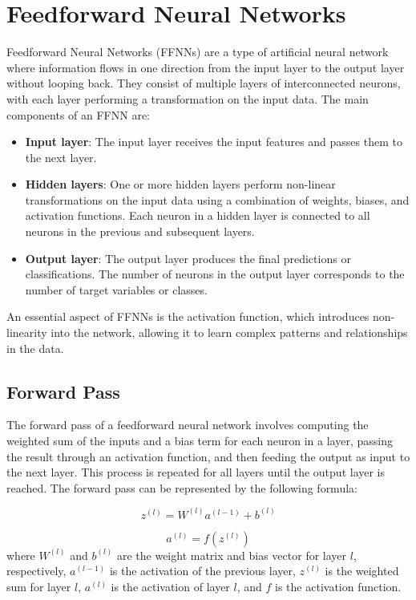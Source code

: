 \documentclass[12pt]{article}
\begin{document}
\section{Feedforward Neural Networks}

Feedforward Neural Networks (FFNNs) are a type of artificial neural network where information flows in one direction from the input layer to the output layer without looping back. They consist of multiple layers of interconnected neurons, with each layer performing a transformation on the input data. The main components of an FFNN are:

\begin{itemize}
\item \textbf{Input layer}: The input layer receives the input features and passes them to the next layer.
\item \textbf{Hidden layers}: One or more hidden layers perform non-linear transformations on the input data using a combination of weights, biases, and activation functions. Each neuron in a hidden layer is connected to all neurons in the previous and subsequent layers.
\item \textbf{Output layer}: The output layer produces the final predictions or classifications. The number of neurons in the output layer corresponds to the number of target variables or classes.
\end{itemize}
An essential aspect of FFNNs is the activation function, which introduces non-linearity into the network, allowing it to learn complex patterns and relationships in the data.

\subsection{Forward Pass}
The forward pass of a feedforward neural network involves computing the weighted sum of the inputs and a bias term for each neuron in a layer, passing the result through an activation function, and then feeding the output as input to the next layer. This process is repeated for all layers until the output layer is reached. The forward pass can be represented by the following formula:

\begin{equation}
z^{(l)} = W^{(l)}a^{(l-1)} + b^{(l)}
\end{equation}

\begin{equation}
a^{(l)} = f(z^{(l)})
\end{equation}
where $W^{(l)}$ and $b^{(l)}$ are the weight matrix and bias vector for layer $l$, respectively, $a^{(l-1)}$ is the activation of the previous layer, $z^{(l)}$ is the weighted sum for layer $l$, $a^{(l)}$ is the activation of layer $l$, and $f$ is the activation function.
\end{document}
